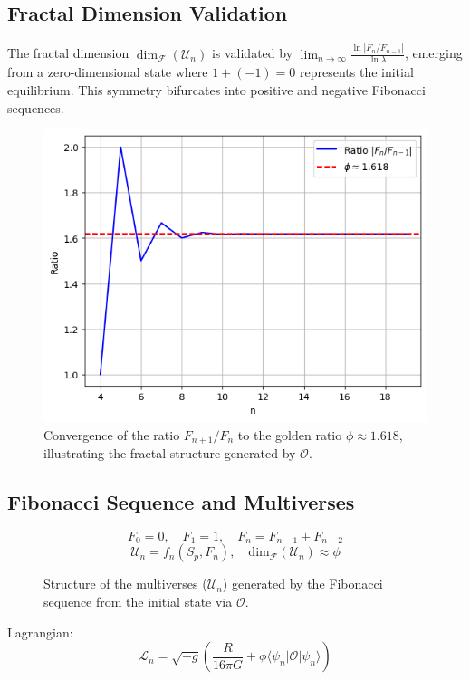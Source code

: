 \documentclass[aps,prl,twocolumn,groupedaddress]{revtex4-2}
\newcommand{\F}[1]{F_{#1}}
\newcommand{\U}[1]{\mathcal{U}_{#1}}
\newcommand{\Opp}{\mathcal{O}}
\newcommand{\dimfrac}{\mathrm{dim}_\mathscr{F}}
\begin{document}
\subsection{Fractal Dimension Validation}
The fractal dimension \(\dim_{\mathscr{F}}(\mathcal{U}_n)\) is validated by \(\lim_{n \to \infty} \frac{\ln |F_n / F_{n-1}|}{\ln \lambda}\), emerging from a zero-dimensional state where \(1 + (-1) = 0\) represents the initial equilibrium. This symmetry bifurcates into positive and negative Fibonacci sequences.

\begin{figure}[h!]
    \centering
    \includegraphics[width=\columnwidth]{figures/fibonacci_ratio.png}
    \caption{Convergence of the ratio \(F_{n+1}/F_n\) to the golden ratio \(\phi \approx 1.618\), illustrating the fractal structure generated by \(\mathcal{O}\).}
    \label{fig:fibonacci_ratio}
\end{figure}

\subsection{Fibonacci Sequence and Multiverses}
\begin{equation}
\F{0} = 0, \quad \F{1} = 1, \quad \F{n} = \F{n-1} + \F{n-2}
\label{eq:fibonacci}
\end{equation}
\begin{equation}
\U{n} = f_n(S_p, \F{n}), \quad \dimfrac(\U{n}) \approx \phi
\label{eq:univers}
\end{equation}
\begin{figure}[h!]
    \centering
    
    \caption{Structure of the multiverses (\(\U{n}\)) generated by the Fibonacci sequence from the initial state via \(\Opp\).}
    \label{fig:fibonacci}
\end{figure}
Lagrangian:
\begin{equation}
\mathcal{L}_n = \sqrt{-g} \left( \frac{R}{16\pi G} + \phi \langle \psi_n | \Opp | \psi_n \rangle \right)
\label{eq:lagrangian}
\end{equation}
\end{document}
